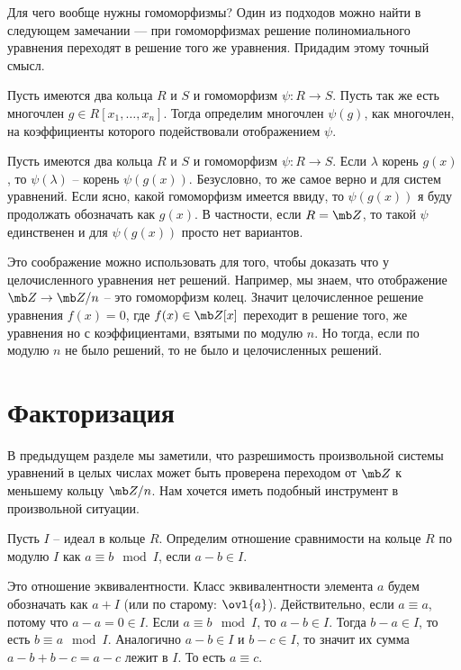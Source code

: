 Для чего вообще нужны гомоморфизмы? Один из подходов можно найти в следующем замечании --- при гомоморфизмах решение полиномиального уравнения переходят в решение того же уравнения. Придадим этому точный смысл.

 Пусть имеются два кольца $R$ и $S$ и гомоморфизм $\psi\colon R \to S$. Пусть так же есть многочлен $g \in R[x_1,\dots,x_n]$. Тогда определим многочлен $\psi(g)$, как многочлен, на коэффициенты которого подействовали отображением $\psi$.
\edfn




  Пусть имеются два кольца $R$ и $S$ и гомоморфизм $\psi\colon R \to S$. Если $\lambda$ корень $g(x)$, то $\psi(\lambda)$ -- корень $\psi(g(x))$.
\elm
Безусловно, то же самое верно и для систем уравнений. Если ясно, какой гомоморфизм имеется ввиду, то $\psi(g(x))$ я буду продолжать обозначать как $g(x)$. В частности, если $R=\mb Z$, то такой $\psi$ единственен и для $\psi(g(x))$ просто нет вариантов. 

Это соображение можно использовать для того, чтобы доказать что у целочисленного уравнения нет решений. Например, мы знаем, что отображение $\mb Z \to \mb Z/n$ -- это гомоморфизм колец. Значит целочисленное решение уравнения $f(x)=0$, где $f(x)\in \mb Z[x]$ переходит в решение того, же уравнения но с коэффициентами, взятыми по модулю $n$. Но тогда, если по модулю $n$ не было  решений, то не было и целочисленных решений. 




\section{Факторизация}

В предыдущем разделе мы заметили, что разрешимость произвольной системы уравнений в целых числах может быть проверена переходом от $\mb Z$ к меньшему кольцу $\mb Z/n$. Нам хочется иметь подобный инструмент в произвольной ситуации.

\dfn Пусть $I$ -- идеал в кольце $R$. Определим отношение сравнимости на кольце $R$ по модулю $I$ как $a\equiv b \mod I$, если $a-b \in I$.
\edfn

\utv Это отношение эквивалентности. Класс эквивалентности элемента $a$ будем обозначать как $a+I$ (или по старому: $\ovl{a}$).
\proof Действительно, если $a\equiv a$, потому что $a-a =0 \in I$. Если $a\equiv b \mod I$, то $a-b \in I$. Тогда $b-a \in I$, то есть $b\equiv a \mod I$. Аналогично $a-b \in I$ и $b-c \in I$, то значит их сумма $a-b+b-c=a-c$ лежит в $I$. То есть $a\equiv c$.
\endproof
\eutv

